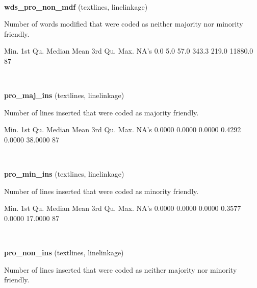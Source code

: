 \documentclass[]{article}
\newenvironment{Shaded}{\begin{snugshade}}{\end{snugshade}}
\newcommand{\StringTok}[1]{\textcolor[rgb]{0.31,0.60,0.02}{{#1}}}
\newcommand{\NormalTok}[1]{{#1}}
\begin{document}
~

\vspace{1em}

\textbf{wds\_pro\_non\_mdf} (textlines, linelinkage)

Number of words modified that were coded as neither majority nor
minority friendly.

\begin{Shaded}
\begin{Highlighting}[]
   \NormalTok{Min. 1st Qu.  Median    Mean 3rd Qu.    Max.    NA}\StringTok{'s }
\StringTok{    0.0     5.0    57.0   343.3   219.0 11880.0      87 }
\end{Highlighting}
\end{Shaded}

~

\vspace{1em}

\textbf{pro\_maj\_ins} (textlines, linelinkage)

Number of lines inserted that were coded as majority friendly.

\begin{Shaded}
\begin{Highlighting}[]
   \NormalTok{Min. 1st Qu.  Median    Mean 3rd Qu.    Max.    NA}\StringTok{'s }
\StringTok{ 0.0000  0.0000  0.0000  0.4292  0.0000 38.0000      87 }
\end{Highlighting}
\end{Shaded}

~

\vspace{1em}

\textbf{pro\_min\_ins} (textlines, linelinkage)

Number of lines inserted that were coded as minority friendly.

\begin{Shaded}
\begin{Highlighting}[]
   \NormalTok{Min. 1st Qu.  Median    Mean 3rd Qu.    Max.    NA}\StringTok{'s }
\StringTok{ 0.0000  0.0000  0.0000  0.3577  0.0000 17.0000      87 }
\end{Highlighting}
\end{Shaded}

~

\vspace{1em}

\textbf{pro\_non\_ins} (textlines, linelinkage)

Number of lines inserted that were coded as neither majority nor
minority friendly.
\end{document}
